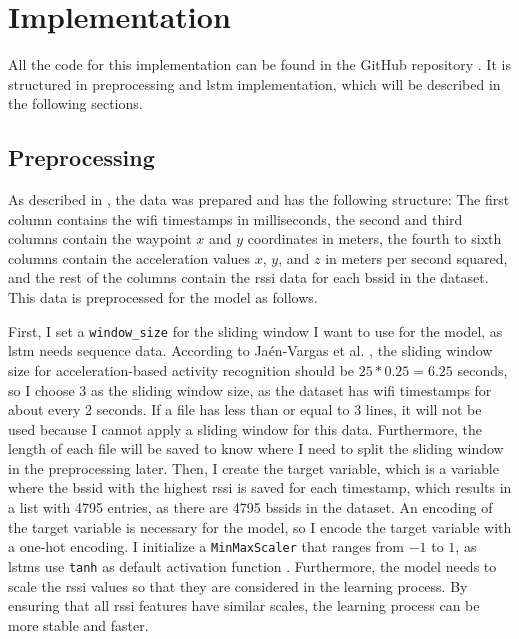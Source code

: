 \chapter{Implementation}\label{ch:implementation}

All the code for this implementation can be found in the GitHub repository \cite{github-repo}.
It is structured in preprocessing and \ac{lstm} implementation, which will be described in the following sections.

\section{Preprocessing}
As described in , the data was prepared and has the following structure:
The first column contains the \ac{wifi} timestamps in milliseconds, the second and third columns contain the waypoint  $x$ and $y$ coordinates  in meters, the fourth to sixth columns contain the acceleration  values $x$, $y$, and $z$ in meters per second squared, and the rest of the columns contain the \ac{rssi} data for each \ac{bssid} in the dataset.
This data is preprocessed for the model as follows.

First, I set a \texttt{window\_size} for the sliding window I want to use for the model, as \ac{lstm} needs sequence data.
According to Ja{\'e}n-Vargas et al. \cite{EffectsSlidingWindow2022}, the sliding window size for acceleration-based activity recognition should be \(25 * 0.25 = 6.25\) seconds, so I choose \(3\) as the sliding window size, as the dataset has \ac{wifi} timestamps for about every 2 seconds.
If a file has less than or equal to \(3\) lines, it will not be used because I cannot apply a sliding window for this data.
Furthermore, the length of each file will be saved to know where I need to split the sliding window in the preprocessing later.
Then, I create the target variable, which is a variable where the \ac{bssid} with the highest \ac{rssi} is saved for each timestamp, which results in a list with 4795 entries, as there are 4795 \acp{bssid} in the dataset.
An encoding of the target variable is necessary for the model, so I encode the target variable with a one-hot encoding.
I initialize a \texttt{MinMaxScaler} that ranges from \(-1\) to \(1\), as \acp{lstm} use \texttt{tanh} as default activation function \cite{tanh-lstm-default}.
Furthermore, the model needs to scale the \ac{rssi} values so that they are considered in the learning process.
By ensuring that all \ac{rssi} features have similar scales, the learning process can be more stable and faster. 

